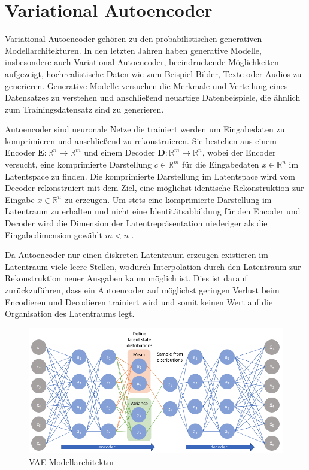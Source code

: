 \section{Variational Autoencoder}\raggedbottom
\label{vae}
Variational Autoencoder \citep{kingma2014autoencoding} gehören zu den probabilistischen generativen Modellarchitekturen. In den letzten Jahren haben generative Modelle, insbesondere auch Variational Autoencoder, beeindruckende Möglichkeiten aufgezeigt, hochrealistische Daten wie zum Beispiel Bilder, Texte oder Audios zu generieren.
Generative Modelle versuchen die Merkmale und Verteilung eines Datensatzes zu verstehen und anschließend neuartige Datenbeispiele, die ähnlich zum Trainingsdatensatz sind zu generieren.

Autoencoder sind neuronale Netze die trainiert werden um Eingabedaten zu komprimieren und anschließend zu rekonstruieren. 
Sie bestehen aus einem Encoder $\mathbf{E}:\mathbb{R}^n \rightarrow \mathbb{R}^m$ und einem Decoder $\mathbf{D}:\mathbb{R}^m \rightarrow \mathbb{R}^n$, wobei der Encoder versucht, eine komprimierte Darstellung $c \in \mathbb{R}^{m}$ für die Eingabedaten $x \in \mathbb{R}^{n}$ im Latentspace zu finden. Die komprimierte Darstellung im Latentspace wird vom Decoder rekonstruiert mit dem Ziel, eine möglichst identische Rekonstruktion zur Eingabe $x \in \mathbb{R}^{n}$ zu erzeugen.
Um stets eine komprimierte Darstellung im Latentraum zu erhalten und nicht eine Identitätsabbildung für den Encoder und Decoder wird die Dimension der Latentrepräsentation niederiger als die Eingabedimension gewählt $m<n$ \citep{introVAE}. 

Da Autoencoder nur einen diskreten Latentraum erzeugen existieren im Latentraum viele leere Stellen, wodurch Interpolation durch den Latentraum zur Rekonstruktion neuer Ausgaben kaum möglich ist.
Dies ist darauf zurückzuführen, dass ein Autoencoder auf möglichst geringen Verlust beim Encodieren und Decodieren trainiert wird und somit keinen Wert auf die Organisation des Latentraums legt. 


\begin{figure}[h]
    \centering
    \includegraphics[width=12cm]{bilder/vae}
    \caption{VAE Modellarchitektur \citep{jordan_2018}}
    \label{vae_model}
\end{figure}


